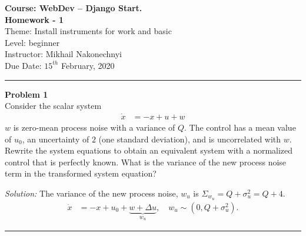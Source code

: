 \documentclass[a4paper, 11pt]{extarticle}
\newenvironment{problem}[2][Problem]
    { \begin{mdframed}[backgroundcolor=gray!20] \textbf{#1 #2} \\}
    {  \end{mdframed}}
\newenvironment{solution}
    {\textit{Solution:}}
    {}
\begin{document}
\noindent
\large{\textbf{Course: WebDev -- Django Start.}} \hfill  \\ 
\vspace{0.25em}
\textbf{Homework - 1}  \hfill  \\

Theme: Install instruments for work and basic \hfill  \\
Level: beginner\\
Instructor: Mikhail Nakonechnyi \\
Due Date: $15^{th}$ February, 2020 \\
\noindent\rule{7in}{2.8pt}
\begin{problem}{1}
Consider the scalar system
\begin{align*}
    \Dot{x} &= -x + u + w
\end{align*}
$w$ is zero-mean process noise with a variance of $Q$. The control has a mean value of $u_0$, an uncertainty of $2$ (one standard deviation), and is uncorrelated with $w$. Rewrite the system equations to obtain an equivalent system with a normalized control that is perfectly known. What is the variance of the new process noise term in the transformed system equation?
\end{problem}
\begin{solution}
The variance of the new process noise, $w_u$ is $\Sigma_{w_{u}} = Q + \sigma^2_u = Q + 4$.
\begin{align*}
    \Dot{x} &= -x + u_0 + \underbrace{w + \Delta u}_{w_{u}}, \quad w_u \sim (0, Q + \sigma^2_u).
\end{align*}
\end{solution} 
\noindent\rule{7in}{2.8pt}

\end{document}

